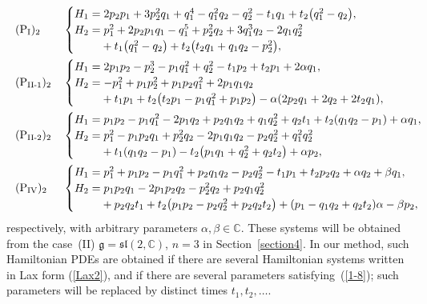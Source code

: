 \documentclass[pdftex]{sigma}
\numberwithin{equation}{section}
\begin{document}
\begin{align}
& (\text{P}_\text{I})_2 && \begin{cases}
 H_1=2p_2p_1 + 3p_2^2q_1 + q_1^4 - q_1^2q_2 - q_2^2 - t_1q_1 + t_2\big(q_1^2 - q_2\big), \\
H_2= p_1^2 + 2p_2p_1q_1 - q_1^5 + p_2^2q_2 + 3q_1^3q_2 - 2q_1q_2^2 \\
\hphantom{H_2=}{} + t_1 \big(q_1^2-q_2\big) + t_2\big(t_2q_1 + q_1q_2 - p_2^2\big),
\end{cases}\label{4dimP1}\\
& (\text{P}_\text{II-1})_2 && \begin{cases}
 H_1 = 2p_1p_2 - p_2^3-p_1q_1^2 + q_2^2 - t_1p_2 + t_2p_1 + 2 \alpha q_1, \\
 H_2= -p_1^2 + p_1p_2^2 + p_1p_2q_1^2 + 2p_1q_1q_2 \\
\hphantom{H_2=}{} + t_1p_1 + t_2\big(t_2p_1 - p_1q_1^2 + p_1p_2\big) - \alpha (2p_2q_1 + 2q_2 + 2t_2q_1),
\end{cases}\label{4dimP21}\\
& (\text{P}_\text{II-2})_2 && \begin{cases}
 H_1=p_1p_2 - p_1q_1^2 - 2p_1q_2 + p_2q_1q_2 + q_1q_2^2 + q_2t_1 + t_2 (q_1q_2-p_1)+ \alpha q_1, \\
 H_2=p_1^2 - p_1p_2q_1 + p_2^2q_2 - 2p_1q_1q_2 - p_2q_2^2 + q_1^2q_2^2 \\
\hphantom{H_2=}{} + t_1( q_1q_2- p_1) - t_2\big(p_1q_1+q_2^2 + q_2t_2\big) + \alpha p_2,
\end{cases}\hspace*{-10mm}\label{4dimP22}\\
& (\text{P}_\text{IV})_2 && \begin{cases}
 H_1=p_1^2 + p_1p_2 - p_1q_1^2 + p_2q_1q_2- p_2q_2^2 - t_1p_1 + t_2p_2q_2 + \alpha q_2 + \beta q_1, \\
H_2= p_1p_2q_1 - 2p_1p_2q_2 - p_2^2 q_2 + p_2q_1q_2^2 \\
\hphantom{H_2=}{} + p_2q_2 t_1+ t_2\big(p_1p_2 - p_2q_2^2 + p_2q_2t_2\big) + (p_1-q_1q_2 + q_2t_2) \alpha - \beta p_2 ,
\end{cases}\hspace*{-10mm}\label{4dimP4}
\end{align}
respectively, with arbitrary parameters $\alpha, \beta \in \mathbb{C}$. These systems will be obtained from the case~(II) $\mathfrak{g} = \mathfrak{sl}(2, \mathbb{C})$, $n = 3$ in Section~\ref{section4}. In our method, such Hamiltonian PDEs are obtained if there are several Hamiltonian systems written in Lax form (\ref{Lax2}), and if there are several parameters satisfying~(\ref{1-8}); such parameters will be replaced by distinct times $t_1, t_2,\dots $.
\end{document}
